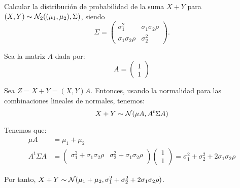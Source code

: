 \begin{ejercicio}
    Calcular la distribución de probabilidad de la suma $X + Y$ para $(X,Y) \sim \mathcal{N}_2((\mu_1,\mu_2),\Sigma)$, siendo
    \[
        \Sigma = \begin{pmatrix}
            \sigma_1^2 & \sigma_1\sigma_2\rho \\
            \sigma_1\sigma_2\rho & \sigma_2^2
        \end{pmatrix}.
    \]
    
    Sea la matriz $A$ dada por:
    \begin{equation*}
        A=\begin{pmatrix}
            1\\
            1
        \end{pmatrix}
    \end{equation*}

    Sea $Z=X+Y=(X,Y)A$. Entonces, usando la normalidad para las combinaciones lineales de normales, tenemos:
    \begin{equation*}
        X+Y\sim \mathcal{N}(\mu A,A^t\Sigma A)
    \end{equation*}

    Tenemos que:
    \begin{align*}
        \mu A &= \mu_1+\mu_2\\
        A^t\Sigma A &= \begin{pmatrix}
            \sigma_1^2 + \sigma_1\sigma_2\rho & \sigma_2^2 + \sigma_1\sigma_2\rho\\
        \end{pmatrix}
        \begin{pmatrix}
            1\\
            1
        \end{pmatrix}
        = \sigma_1^2 + \sigma_2^2 + 2\sigma_1\sigma_2\rho
    \end{align*}

    Por tanto, $X+Y\sim \mathcal{N}(\mu_1+\mu_2,\sigma_1^2 + \sigma_2^2 + 2\sigma_1\sigma_2\rho)$.
\end{ejercicio}

